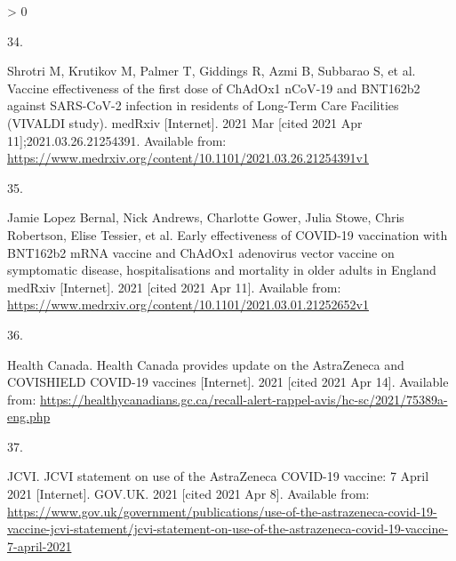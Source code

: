 \documentclass[]{elsarticle} %
\newlength{\csllabelwidth}
\newlength{\cslhangindent}
\newenvironment{CSLReferences}[3] %
 {%
  \setlength{\parindent}{0pt}
  \ifodd #1 \everypar{\setlength{\hangindent}{\cslhangindent}}\ignorespaces\fi
  \ifnum #2 > 0
  \setlength{\parskip}{#2\baselineskip}
  \fi
 }%
 {}
\newcommand{\CSLLeftMargin}[1]{\parbox[t]{\csllabelwidth}{#1}}
\newcommand{\CSLRightInline}[1]{\parbox[t]{\linewidth - \csllabelwidth}{#1}}
\begin{document}
\begin{CSLReferences}{0}{0}
\leavevmode\hypertarget{ref-shrotri_vaccine_2021}{}%
\CSLLeftMargin{34. }
\CSLRightInline{Shrotri M, Krutikov M, Palmer T, Giddings R, Azmi B,
Subbarao S, et al. Vaccine effectiveness of the first dose of {ChAdOx1}
{nCoV}-19 and {BNT162b2} against {SARS}-{CoV}-2 infection in residents
of {Long}-{Term} {Care} {Facilities} ({VIVALDI} study). medRxiv
{[}Internet{]}. 2021 Mar {[}cited 2021 Apr 11{]};2021.03.26.21254391.
Available from:
\url{https://www.medrxiv.org/content/10.1101/2021.03.26.21254391v1}}

\leavevmode\hypertarget{ref-jamie_lopez_bernal_early_2021}{}%
\CSLLeftMargin{35. }
\CSLRightInline{Jamie Lopez Bernal, Nick Andrews, Charlotte Gower, Julia
Stowe, Chris Robertson, Elise Tessier, et al. Early effectiveness of
{COVID}-19 vaccination with {BNT162b2} {mRNA} vaccine and {ChAdOx1}
adenovirus vector vaccine on symptomatic disease, hospitalisations and
mortality in older adults in {England} {{}} {medRxiv} {[}Internet{]}.
2021 {[}cited 2021 Apr 11{]}. Available from:
\url{https://www.medrxiv.org/content/10.1101/2021.03.01.21252652v1}}

\leavevmode\hypertarget{ref-health_canada_health_2021}{}%
\CSLLeftMargin{36. }
\CSLRightInline{Health Canada. Health {Canada} provides update on the
{AstraZeneca} and {COVISHIELD} {COVID}-19 vaccines {[}Internet{]}. 2021
{[}cited 2021 Apr 14{]}. Available from:
\url{https://healthycanadians.gc.ca/recall-alert-rappel-avis/hc-sc/2021/75389a-eng.php}}

\leavevmode\hypertarget{ref-jcvi_jcvi_2021}{}%
\CSLLeftMargin{37. }
\CSLRightInline{JCVI. {JCVI} statement on use of the {AstraZeneca}
{COVID}-19 vaccine: 7 {April} 2021 {[}Internet{]}. GOV.UK. 2021 {[}cited
2021 Apr 8{]}. Available from:
\url{https://www.gov.uk/government/publications/use-of-the-astrazeneca-covid-19-vaccine-jcvi-statement/jcvi-statement-on-use-of-the-astrazeneca-covid-19-vaccine-7-april-2021}}

\end{CSLReferences}
\end{document}
